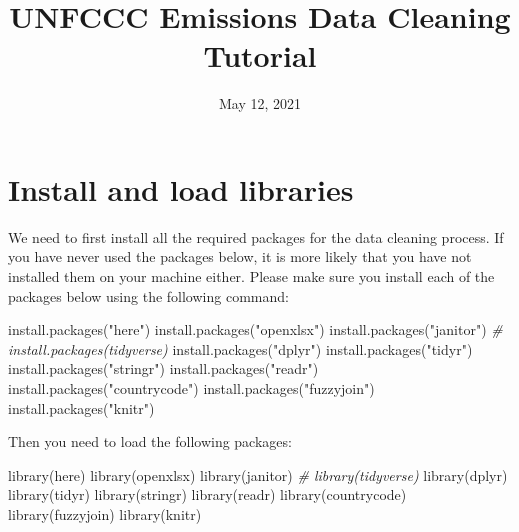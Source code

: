 \documentclass[
  12pt,
]{article}
\title{UNFCCC Emissions Data Cleaning Tutorial}
\author{}
\date{\vspace{-2.5em}May 12, 2021}
\newenvironment{Shaded}{}{}
\newcommand{\CommentTok}[1]{\textcolor[rgb]{0.38,0.63,0.69}{\textit{#1}}}
\newcommand{\FunctionTok}[1]{\textcolor[rgb]{0.02,0.16,0.49}{#1}}
\newcommand{\NormalTok}[1]{#1}
\newcommand{\StringTok}[1]{\textcolor[rgb]{0.25,0.44,0.63}{#1}}
\renewcommand\maketitle{}
\begin{document}
\maketitle

\hypertarget{install-and-load-libraries}{%
\section{Install and load libraries}\label{install-and-load-libraries}}

We need to first install all the required packages for the data cleaning
process. If you have never used the packages below, it is more likely
that you have not installed them on your machine either. Please make
sure you install each of the packages below using the following command:

\begin{Shaded}
\begin{Highlighting}[]
\FunctionTok{install.packages}\NormalTok{(}\StringTok{"here"}\NormalTok{)}
\FunctionTok{install.packages}\NormalTok{(}\StringTok{"openxlsx"}\NormalTok{)}
\FunctionTok{install.packages}\NormalTok{(}\StringTok{"janitor"}\NormalTok{)}
\CommentTok{\# install.packages(\textquotesingle{}tidyverse\textquotesingle{})}
\FunctionTok{install.packages}\NormalTok{(}\StringTok{"dplyr"}\NormalTok{)}
\FunctionTok{install.packages}\NormalTok{(}\StringTok{"tidyr"}\NormalTok{)}
\FunctionTok{install.packages}\NormalTok{(}\StringTok{"stringr"}\NormalTok{)}
\FunctionTok{install.packages}\NormalTok{(}\StringTok{"readr"}\NormalTok{)}
\FunctionTok{install.packages}\NormalTok{(}\StringTok{"countrycode"}\NormalTok{)}
\FunctionTok{install.packages}\NormalTok{(}\StringTok{"fuzzyjoin"}\NormalTok{)}
\FunctionTok{install.packages}\NormalTok{(}\StringTok{"knitr"}\NormalTok{)}
\end{Highlighting}
\end{Shaded}

Then you need to load the following packages:

\begin{Shaded}
\begin{Highlighting}[]
\FunctionTok{library}\NormalTok{(here)}
\FunctionTok{library}\NormalTok{(openxlsx)}
\FunctionTok{library}\NormalTok{(janitor)}
\CommentTok{\# library(tidyverse)}
\FunctionTok{library}\NormalTok{(dplyr)}
\FunctionTok{library}\NormalTok{(tidyr)}
\FunctionTok{library}\NormalTok{(stringr)}
\FunctionTok{library}\NormalTok{(readr)}
\FunctionTok{library}\NormalTok{(countrycode)}
\FunctionTok{library}\NormalTok{(fuzzyjoin)}
\FunctionTok{library}\NormalTok{(knitr)}
\end{Highlighting}
\end{Shaded}
\end{document}
